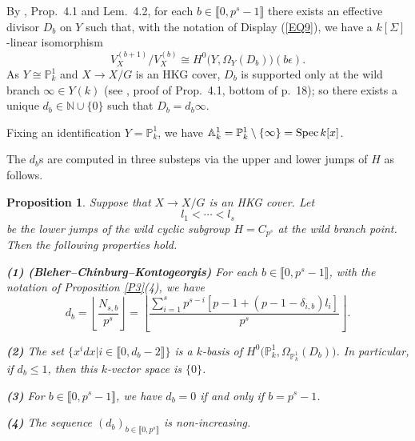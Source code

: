\documentclass[11pt]{amsart}
\newtheorem{proposition}[theorem]{Proposition}
\def\Spec{\textup{Spec}}
\begin{document}
By \cite{BCK}, Prop.\ 4.1 and Lem.\ 4.2, for each $b\in\llbracket0,p^s-1\rrbracket$ there exists an effective divisor $D_b$ on $Y$ such that, with the notation of Display (\ref{EQ9}), we have a $k[\Sigma]$-linear isomorphism
\begin{equation}\label{EQ50}
V_X^{(b+1)}/V_X^{(b)}\cong H^0\bigl(Y,\Omega_Y(D_b)\bigr)(b\epsilon).
\end{equation}
As $Y\cong\mathbb P_k^1$ and $X\rightarrow X/G$ is an HKG cover, $D_b$ is supported only at the wild branch $\infty\in Y(k)$ (see \cite{BCK}, proof of Prop.\ 4.1, bottom of p.\ 18); so there exists a unique $d_b\in\mathbb N\cup\{0\}$ such that $D_b=d_b\infty$.

Fixing an identification $Y=\mathbb P^1_k$, we have $\mathbb A^1_k=\mathbb P^1_k\setminus\{\infty\}=\Spec\, k[x]$. 

The $d_b$s are computed in three substeps via the upper and lower jumps of $H$ as follows.

\begin{proposition}\label{P6}
Suppose that $X\rightarrow X/G$ is an HKG cover. Let
$$l_1<\cdots<l_s$$
be the lower jumps of the wild cyclic subgroup $H=C_{p^s}$ at the wild branch point. Then the following properties hold.

\medskip
\smallskip
{\bf (1) (Bleher--Chinburg--Kontogeorgis)} For each $b\in\llbracket0,p^s-1\rrbracket$, with the notation of Proposition \ref{P3}(4), we have
\begin{equation}\label{EQ51}
d_b=\left\lfloor \frac{N_{s,b}}{p^s}\right\rfloor=\left\lfloor \frac{\sum_{i=1}^s p^{s-i}[p-1+(p-1-\delta_{i,b})l_i]}{p^s}\right\rfloor.
\end{equation}

{\bf (2)} The set $\{x^idx|i\in\llbracket0,d_b-2\rrbracket\}$ is a $k$-basis of $H^0\bigl(\mathbb P_k^1,\Omega_{\mathbb P_k^1}(D_b)\bigr)$. In particular, if $d_b\le 1$, then this $k$-vector space is $\{0\}$.

\smallskip
{\bf (3)} For $b\in\llbracket0,p^s-1\rrbracket$, we have $d_b=0$ if and only if $b=p^s-1$.

\smallskip
{\bf (4)} The sequence $(d_b)_{b\in\llbracket0,p^s\rrbracket}$ is non-increasing.
\end{proposition}
\end{document}
